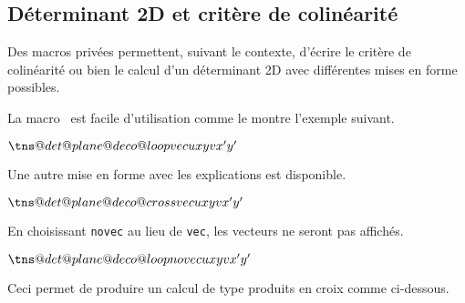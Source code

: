 \documentclass[12pt,a4paper]{article}
\begin{document}

\subsection{Déterminant 2D et critère de colinéarité}

Des macros privées permettent, suivant le contexte, d'écrire le critère de colinéarité ou bien le calcul d'un déterminant 2D avec différentes mises en forme possibles.





La macro  est facile d'utilisation comme le montre l'exemple suivant.

\begin{latexex}
\makeatletter
$\tns@det@plane@deco@loop%
     {vec}     %
     {u}       %
     {x}{y}    %
     {v}       %
     {x'}{y'}$ %
\makeatother
\end{latexex}





Une autre mise en forme avec les explications est disponible.

\begin{latexex}
\makeatletter
$\tns@det@plane@deco@cross%
     {vec}     %
     {u}       %
     {x}{y}    %
     {v}       %
     {x'}{y'}$ %
\makeatother
\end{latexex}





En choisissant \verb+novec+ au lieu de \verb+vec+, les vecteurs ne seront pas affichés.

\begin{latexex}
\makeatletter
$\tns@det@plane@deco@loop{novec}    %
                         {u}{x}{y}  %
                         {v}{x'}{y'}$
\makeatother
\end{latexex}


Ceci permet de produire un calcul de type produits en croix comme ci-dessous.
\end{document}
